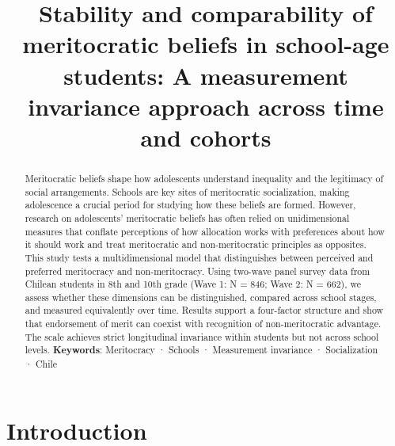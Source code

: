 \documentclass[
  13pt,
]{article}
\title{Stability and comparability of meritocratic beliefs in school-age
students: A measurement invariance approach across time and cohorts}
\author{ }
\date{}
\begin{document}
\maketitle
\begin{abstract}
Meritocratic beliefs shape how adolescents understand inequality and the
legitimacy of social arrangements. Schools are key sites of meritocratic
socialization, making adolescence a crucial period for studying how
these beliefs are formed. However, research on adolescents' meritocratic
beliefs has often relied on unidimensional measures that conflate
perceptions of how allocation works with preferences about how it should
work and treat meritocratic and non-meritocratic principles as
opposites. This study tests a multidimensional model that distinguishes
between perceived and preferred meritocracy and non-meritocracy. Using
two-wave panel survey data from Chilean students in 8th and 10th grade
(Wave 1: N = 846; Wave 2: N = 662), we assess whether these dimensions
can be distinguished, compared across school stages, and measured
equivalently over time. Results support a four-factor structure and show
that endorsement of merit can coexist with recognition of
non-meritocratic advantage. The scale achieves strict longitudinal
invariance within students but not across school levels. \newline
\textbf{Keywords}: Meritocracy · Schools · Measurement invariance ·
Socialization · Chile
\end{abstract}


\section{Introduction}\label{introduction}
\end{document}
